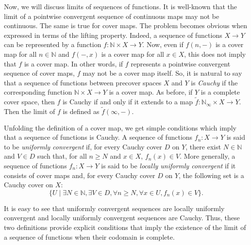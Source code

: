 \documentclass[reqno]{amsart}
\theoremstyle{definition}
\theoremstyle{remark}
\numberwithin{figure}{section}
\begin{document}
Now, we will discuss limits of sequences of functions.
It is well-known that the limit of a pointwise convergent sequence of continuous maps may not be continuous.
The same is true for cover maps.
The problem becomes obvious when expressed in terms of the lifting property.
Indeed, a sequence of functions $X \to Y$ can be represented by a function $f : \mathbb{N} \times X \to Y$.
Now, even if $f(n,-)$ is a cover map for all $n \in \mathbb{N}$ and $f(-,x)$ is a cover map for all $x \in X$, this does not imply that $f$ is a cover map.
In other words, if $f$ represents a pointwise convergent sequence of cover maps, $f$ may not be a cover map itself.
So, it is natural to say that a sequence of functions between precover spaces $X$ and $Y$ is \emph{Cauchy} if the corresponding function $\mathbb{N} \times X \to Y$ is a cover map.
As before, if $Y$ is a complete cover space, then $f$ is Cauchy if and only if it extends to a map $\widetilde{f} : \mathbb{N}_\infty \times X \to Y$.
Then the limit of $f$ is defined as $\widetilde{f}(\infty,-)$.

Unfolding the definition of a cover map, we get simple conditions which imply that a sequence of functions is Cauchy.
A sequence of functions $f_n : X \to Y$ is said to be \emph{uniformly convergent} if,
for every Cauchy cover $D$ on $Y$, there exist $N \in \mathbb{N}$ and $V \in D$ such that, for all $n \geq N$ and $x \in X$, $f_n(x) \in V$.
More generally, a sequence of functions $f_n : X \to Y$ is said to be \emph{locally uniformly convergent} if it consists of cover maps and,
for every Cauchy cover $D$ on $Y$, the following set is a Cauchy cover on $X$:
\[ \{ U \mid \exists N \in \mathbb{N}, \exists V \in D, \forall n \geq N, \forall x \in U, f_n(x) \in V \}. \]

It is easy to see that uniformly convergent sequences are locally uniformly convergent and locally uniformly convergent sequences are Cauchy.
Thus, these two definitions provide explicit conditions that imply the existence of the limit of a sequence of functions when their codomain is complete.





\end{document}

